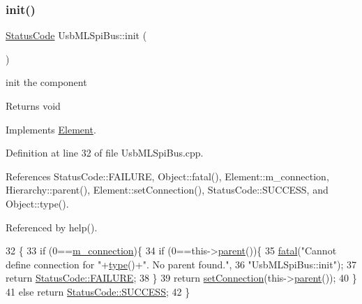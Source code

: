 \subsubsection{\texorpdfstring{init()}{init()}}
{\footnotesize\ttfamily \hyperlink{classStatusCode}{Status\+Code} Usb\+M\+L\+Spi\+Bus\+::init (\begin{DoxyParamCaption}{ }\end{DoxyParamCaption})\hspace{0.3cm}{\ttfamily [virtual]}}

init the component

\begin{DoxyReturn}{Returns}
void 
\end{DoxyReturn}


Implements \hyperlink{classElement_af42754b5cabc198869222725218d695c}{Element}.



Definition at line 32 of file Usb\+M\+L\+Spi\+Bus.\+cpp.



References Status\+Code\+::\+F\+A\+I\+L\+U\+RE, Object\+::fatal(), Element\+::m\+\_\+connection, Hierarchy\+::parent(), Element\+::set\+Connection(), Status\+Code\+::\+S\+U\+C\+C\+E\+SS, and Object\+::type().



Referenced by help().


\begin{DoxyCode}
32                              \{
33   \textcolor{keywordflow}{if} (0==\hyperlink{classElement_abe3de7a5dbbc9a6dd2d7e012e5fdb266}{m\_connection})\{
34     \textcolor{keywordflow}{if} (0==this->\hyperlink{classHierarchy_a1c7bec8257e717f9c1465e06ebf845fc}{parent}())\{
35       \hyperlink{classObject_aad5a16aac7516ce65bd5ec02ab07fc80}{fatal}(\textcolor{stringliteral}{"Cannot define connection for "}+\hyperlink{classObject_a84f99f70f144a83e1582d1d0f84e4e62}{type}()+\textcolor{stringliteral}{". No parent found."},
36           \textcolor{stringliteral}{"UsbMLSpiBus::init"});
37         \textcolor{keywordflow}{return} \hyperlink{classStatusCode_a6f565cbeadc76d14c72f047e5e85eb4ba3da73d4c469762eb9d3c960368252b26}{StatusCode::FAILURE};
38     \}
39     \textcolor{keywordflow}{return} \hyperlink{classElement_ab476b4b1df5954141ceb14f072433b89}{setConnection}(this->\hyperlink{classHierarchy_a1c7bec8257e717f9c1465e06ebf845fc}{parent}());
40   \}
41   \textcolor{keywordflow}{else} \textcolor{keywordflow}{return} \hyperlink{classStatusCode_a6f565cbeadc76d14c72f047e5e85eb4badd0da38d3ba0d922efd1f4619bc37ad8}{StatusCode::SUCCESS};
42 \}
\end{DoxyCode}
\mbox{\label{classUsbMLSpiBus_a54d922397179722e0117626db1fdbe70}} 
